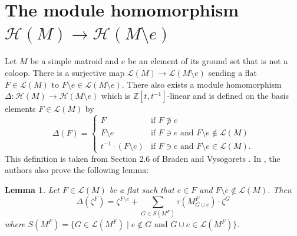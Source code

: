 \documentclass[11pt]{article}
\newcommand{\calL}{\mathcal{L}}
\newcommand{\calH}{\mathcal{H}}
\newtheorem{lemma}[theorem]{Lemma}
\theoremstyle{remark}
\begin{document}
\section{The module homomorphism $\calH(M) \to \calH(M\setminus e)$}
\label{sec:module_homomorphism}
Let $M$ be a simple matroid and $e$ be an element of its ground set that is not a coloop.
There is a surjective map $\calL(M) \to \calL(M\setminus e)$ sending a flat $F \in \calL(M)$ to $F\setminus e \in \calL(M\setminus e)$.
There also exists a module homomorphism $\Delta: \calH(M) \to \calH(M\setminus e)$ which
is $\mathbb{Z}[t, t^{-1}]$-linear and is defined on the basis elements $F \in \calL(M)$ by
\[
    \Delta(F) = \begin{cases}
        F                          & \text{if }F\not\ni e                                       \\
        F\setminus e               & \text{if } F\ni e \text{ and }F\setminus e \notin \calL(M) \\
        t^{-1}\cdot (F\setminus e) & \text{if } F\ni e \text{ and }F\setminus e \in \calL(M).
    \end{cases}
\]
This definition is taken from Section 2.6 of Braden and Vysogorets \cite{Bra19}.
In \cite{Bra19}, the authors also prove the following lemma:

\begin{lemma}
    \label{lem:delta_zeta_nocoloop}
    Let $F \in \calL(M)$ be a flat such that $e \in F$ and $F\setminus e \notin \calL(M)$. Then
    \[\Delta(\zeta^F) = \zeta^{F\setminus e} + \sum_{G\in S(M^F)}\tau(M^F_{G\cup e})\cdot\zeta^G\]
    where $S(M^F) = \{G\in \calL(M^F)\mid e\notin G \text{ and } G\cup e \in \calL(M^F)\}$.
\end{lemma}
\end{document}
